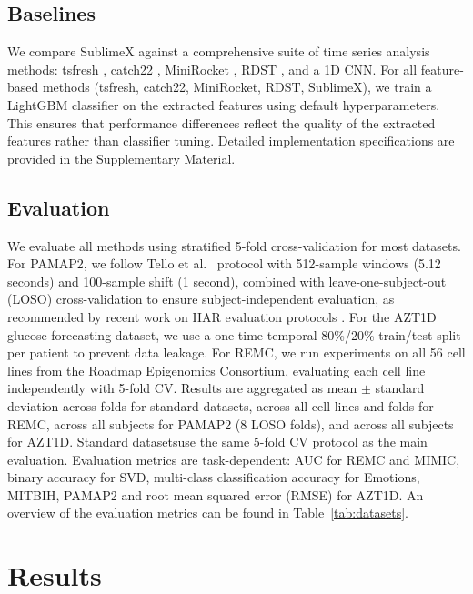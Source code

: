 \documentclass[times, review, 10pt]{elsarticle}
\begin{document}
\subsection{Baselines}
\label{sec:baselines}
We compare SublimeX against a comprehensive suite of time series analysis methods: tsfresh \cite{christ2018tsfresh}, catch22 \cite{lubba2019catch22}, MiniRocket \cite{dempster2021minirocket}, 
RDST \cite{guillaume2022random}, and a 1D CNN. For all feature-based methods (tsfresh, catch22, MiniRocket, RDST, SublimeX), we train a LightGBM
classifier \cite{ke2017lightgbm} on the extracted features using default hyperparameters. This ensures that performance differences reflect the quality of the extracted features rather than
classifier tuning. Detailed implementation specifications are provided in the Supplementary Material.

\subsection{Evaluation}
We evaluate all methods using stratified 5-fold cross-validation for most datasets. For PAMAP2, we follow Tello et al.\ \cite{tello2025contrasting} protocol with 512-sample windows
(5.12 seconds) and 100-sample shift (1 second), combined with leave-one-subject-out (LOSO) cross-validation to ensure subject-independent evaluation, as recommended by recent work on
HAR evaluation protocols \cite{tello2025contrasting, geissler2024power}. For the AZT1D glucose forecasting dataset, we use a one time temporal 80\%/20\% train/test split per patient to prevent data leakage.
For REMC, we run experiments on all 56 cell lines from the Roadmap Epigenomics Consortium, evaluating each cell line independently with 5-fold CV.
Results are aggregated as mean $\pm$ standard deviation across folds for standard datasets, across all cell lines and folds for REMC, across
all subjects for PAMAP2 (8 LOSO folds), and across all subjects for AZT1D. Standard datasetsuse the same 5-fold CV protocol as the main evaluation. Evaluation metrics are task-dependent:
AUC for REMC and MIMIC, binary accuracy for SVD, multi-class classification accuracy for Emotions, MITBIH, PAMAP2 and root mean squared error (RMSE) for AZT1D.
An overview of the evaluation metrics can be found in Table~\ref{tab:datasets}.

\section{Results}
\end{document}
